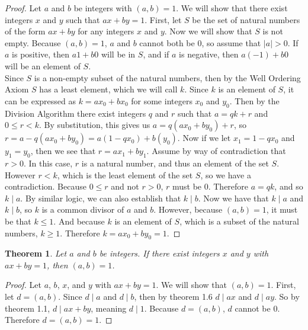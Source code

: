 \documentclass[12pt,leqno]{article}
\numberwithin{equation}{section}
\newtheorem{thm}{Theorem}[section]
\theoremstyle{definition}
\newcommand{\card}[1]{\left| #1 \right|}
\begin{document}
\begin{proof}[Proof]
Let $a$ and $b$ be integers with $(a, b) = 1$.  We will show that there exist integers $x$ and $y$ such that $ax + by = 1$.  First, let $S$ be the set of natural numbers of the form $ax + by$ for any integers $x$ and $y$.  Now we will show that $S$ is not empty.  Because $(a, b) = 1$, $a$ and $b$ cannot both be $0$, so assume that $\card{a} > 0$.  If $a$ is positive, then $a1 + b0$ will be in $S$, and if $a$ is negative, then $a(-1) + b0$ will be an element of $S$.\\

Since $S$ is a non-empty subset of the natural numbers, then by the Well Ordering Axiom $S$ has a least element, which we will call $k$.  Since $k$ is an element of $S$, it can be expressed as $k = ax_0 + bx_0$ for some integers $x_0$ and $y_0$.  Then by the Division Algorithm there exist integers $q$ and $r$ such that $a = qk + r$ and $0 \leq r < k$.  By substitution, this gives us $a = q(ax_0 + by_0) + r$, so $r = a - q(ax_0 + by_0) = a(1-qx_0) + b(y_0)$.  Now if we let $x_1 = 1-qx_0$ and $y_1 = y_0$, then we see that $r = ax_1 + by_1$.  Assume by way of contradiction that $r > 0$.  In this case, $r$ is a natural number, and thus an element of the set $S$.  However $r < k$, which is the least element of the set $S$, so we have a contradiction.  Because $0 \leq r$ and not $r > 0$, $r$ must be $0$.  Therefore $a = qk$, and so $k \mid a$.  By similar logic, we can also establish that $k \mid b$.  Now we have that $k \mid a$ and $k \mid b$, so $k$ is a common divisor of $a$ and $b$.  However, because $(a, b) = 1$, it must be that $k \leq 1$.  And because $k$ is an element of $S$, which is a subset of the natural numbers, $k \geq 1$.  Therefore $k = ax_0 + by_0 = 1$.
\end{proof}

\pagebreak
\begin{thm}
Let $a$ and $b$ be integers. If there exist integers $x$ and $y$
with $ax + by = 1$, then $(a, b) = 1$.
\end{thm}

\begin{proof}[Proof]
Let $a$, $b$, $x$, and $y$ with $ax + by = 1$.  We will show that $(a, b) = 1$.  First, let $d = (a, b)$.  Since $d \mid a$ and $d \mid b$, then by theorem 1.6 $d \mid ax$ and $d \mid ay$.  So by theorem 1.1, $d \mid ax + by$, meaning $d \mid 1$.  Because $d = (a, b)$, $d$ cannot be $0$.  Therefore $d = (a, b) = 1$.
\end{proof}
\end{document}

